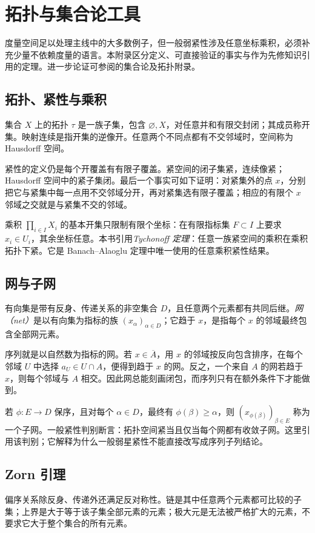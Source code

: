 \setcounter{chapter}{1} %
\chapter{拓扑与集合论工具}
\label{app:fa-topology}

度量空间足以处理主线中的大多数例子，但一般弱紧性涉及任意坐标乘积，必须补充少量不依赖度量的语言。本附录区分定义、可直接验证的事实与作为先修知识引用的定理。进一步论证可参阅\cite{teschl-fa}的集合论及拓扑附录。

\section{拓扑、紧性与乘积}
集合 $X$ 上的拓扑 $\tau$ 是一族子集，包含 $\varnothing,X$，对任意并和有限交封闭；其成员称开集。映射连续是指开集的逆像开。任意两个不同点都有不交邻域时，空间称为 Hausdorff 空间。

紧性的定义仍是每个开覆盖有有限子覆盖。紧空间的闭子集紧，连续像紧；Hausdorff 空间中的紧子集闭。最后一个事实可如下证明：对紧集外的点 $x$，分别把它与紧集中每一点用不交邻域分开，再对紧集选有限子覆盖；相应的有限个 $x$ 邻域之交就是与紧集不交的邻域。

乘积 $\prod_{i\in I}X_i$ 的基本开集只限制有限个坐标：在有限指标集 $F\subset I$ 上要求 $x_i\in U_i$，其余坐标任意。本书引用\emph{Tychonoff 定理}：任意一族紧空间的乘积在乘积拓扑下紧。它是 Banach--Alaoglu 定理中唯一使用的任意乘积紧性结果。

\section{网与子网}
有向集是带有反身、传递关系的非空集合 $D$，且任意两个元素都有共同后继。\emph{网（net）}是以有向集为指标的族 $(x_\alpha)_{\alpha\in D}$；它趋于 $x$，是指每个 $x$ 的邻域最终包含全部网元素。

序列就是以自然数为指标的网。若 $x\in\overline A$，用 $x$ 的邻域按反向包含排序，在每个邻域 $U$ 中选择 $a_U\in U\cap A$，便得到趋于 $x$ 的网。反之，一个来自 $A$ 的网若趋于 $x$，则每个邻域与 $A$ 相交。因此网总能刻画闭包，而序列只有在额外条件下才能做到。

若 $\phi:E\to D$ 保序，且对每个 $\alpha\in D$，最终有 $\phi(\beta)\geq\alpha$，则 $(x_{\phi(\beta)})_{\beta\in E}$ 称为一个子网。一般紧性判别断言：拓扑空间紧当且仅当每个网都有收敛子网。这里引用该判别；它解释为什么一般弱星紧性不能直接改写成序列子列结论。

\section{Zorn 引理}
偏序关系除反身、传递外还满足反对称性。链是其中任意两个元素都可比较的子集；上界是大于等于该子集全部元素的元素；极大元是无法被严格扩大的元素，不要求它大于整个集合的所有元素。


